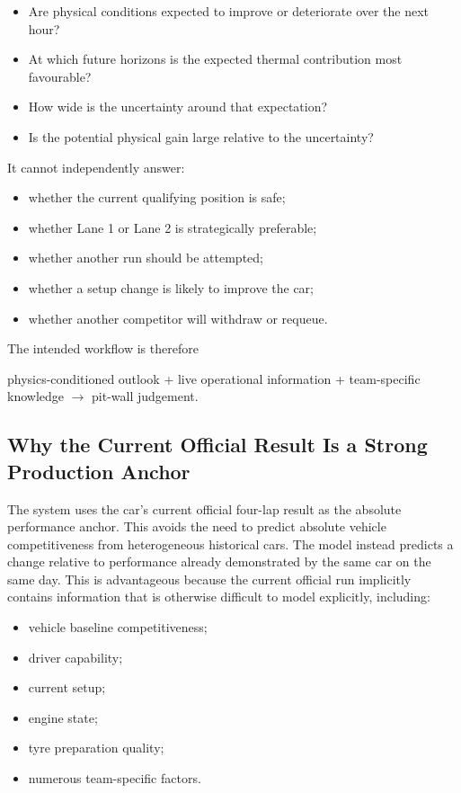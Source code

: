 \begin{itemize}
\item Are physical conditions expected to improve or deteriorate over the next hour?
\item At which future horizons is the expected thermal contribution most favourable?
\item How wide is the uncertainty around that expectation?
\item Is the potential physical gain large relative to the uncertainty?
\end{itemize}

It cannot independently answer:

\begin{itemize}
\item whether the current qualifying position is safe;
\item whether Lane 1 or Lane 2 is strategically preferable;
\item whether another run should be attempted;
\item whether a setup change is likely to improve the car;
\item whether another competitor will withdraw or requeue.
\end{itemize}

The intended workflow is therefore

physics-conditioned outlook + live operational information + team-specific knowledge \ensuremath{\rightarrow} pit-wall judgement.

\subsection{Why the Current Official Result Is a Strong Production Anchor}
The system uses the car's current official four-lap result as the absolute performance anchor. This avoids the need to predict absolute vehicle competitiveness from heterogeneous historical cars. The model instead predicts a change relative to performance already demonstrated by the same car on the same day. This is advantageous because the current official run implicitly contains information that is otherwise difficult to model explicitly, including:

\begin{itemize}
\item vehicle baseline competitiveness;
\item driver capability;
\item current setup;
\item engine state;
\item tyre preparation quality;
\item numerous team-specific factors.
\end{itemize}

